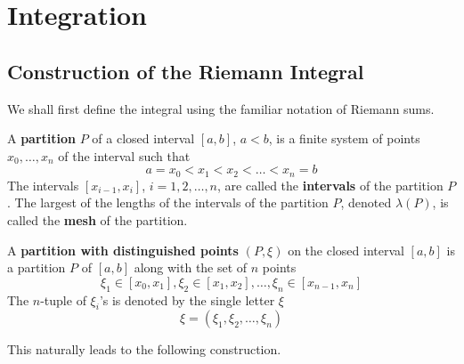 \section{Integration}

  \subsection{Construction of the Riemann Integral}

    We shall first define the integral using the familiar notation of Riemann sums. 

    \begin{definition}
      A \textbf{partition} $P$ of a closed interval $[a, b]$, $a < b$, is a finite system of points $x_0, \ldots, x_n$ of the interval such that
      \[a = x_0 < x_1 < x_2 < \ldots < x_n = b\]
      The intervals $[x_{i-1}, x_i]$, $i = 1, 2, \ldots, n$, are called the \textbf{intervals} of the partition $P$. The largest of the lengths of the intervals of the partition $P$, denoted $\lambda(P)$, is called the \textbf{mesh} of the partition. 

      A \textbf{partition with distinguished points} $(P, \xi)$ on the closed interval $[a, b]$ is a partition $P$ of $[a,b]$ along with the set of $n$ points 
      \[\xi_1 \in [x_0, x_1], \xi_2 \in [x_1, x_2], \ldots, \xi_n \in [x_{n-1}, x_n]\]
      The $n$-tuple of $\xi_i$'s is denoted by the single letter $\xi$
      \[\xi = (\xi_1, \xi_2, \ldots, \xi_n)\]
    \end{definition}

    This naturally leads to the following construction. 

